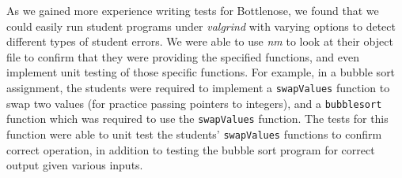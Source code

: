 As we gained more experience writing tests for Bottlenose, we found that we
could easily run student programs under \textit{valgrind} with varying options
to detect different types of student errors. We were able to use \textit{nm}
to look at their object file to confirm that they were providing the specified
functions, and even implement unit testing of those specific functions. For
example, in a bubble sort assignment, the students were required to implement
a \texttt{swapValues} function to swap two values (for practice passing
pointers to integers), and a \texttt{bubblesort} function which was required
to use the \texttt{swapValues} function. The tests for this function were able
to unit test the students' \texttt{swapValues} functions to confirm correct
operation, in addition to testing the bubble sort program for correct output
given various inputs.


